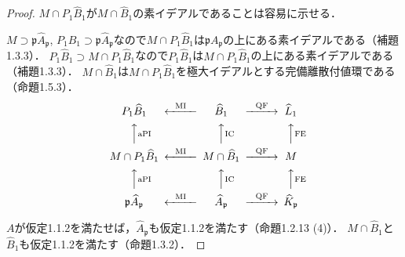 \begin{proof}
  $M\cap P_1\widehat{B}_1$が$M\cap\widehat{B}_1$の素イデアルであることは容易に示せる．

  $M\supset\mathfrak{p}\widehat{A}_\mathfrak{p}$, $P_1\widehat{B}_1\supset\mathfrak{p}\widehat{A}_\mathfrak{p}$なので$M\cap P_1\widehat{B}_1$は$\mathfrak{p}A_\mathfrak{p}$の上にある素イデアルである（補題1.3.3）．
  $P_1\widehat{B}_1\supset M\cap P_1\widehat{B}_1$なので$P_1\widehat{B}_1$は$M\cap P_1\widehat{B}_1$の上にある素イデアルである（補題1.3.3）．
  $M\cap\widehat{B}_1$は$M\cap P_1\widehat{B}_1$を極大イデアルとする完備離散付値環である（命題1.5.3）．
  \[
  \begin{CD}
    P_1\widehat{B}_1                     @<\text{MI}<< \widehat{B}_1            @>\text{QF}>> \widehat{L}_1\\
    @AA\text{aPI}A                   @AA\text{IC}A                      @AA\text{FE}A \\
    M\cap P_1\widehat{B}_1               @<\text{MI}<< M\cap\widehat{B}_1       @>\text{QF}>> M\\
    @AA\text{aPI}A                   @AA\text{IC}A                      @AA\text{FE}A \\
    \mathfrak{p}\widehat{A}_\mathfrak{p} @<\text{MI}<< \widehat{A}_\mathfrak{p} @>\text{QF}>> \widehat{K}_\mathfrak{p}
  \end{CD}
  \]

  $A$が仮定1.1.2を満たせば，$\widehat{A}_\mathfrak{p}$も仮定1.1.2を満たす（命題1.2.13 (4)）．
  $M\cap\widehat{B}_1$と$\widehat{B}_1$も仮定1.1.2を満たす（命題1.3.2）．
\end{proof}

